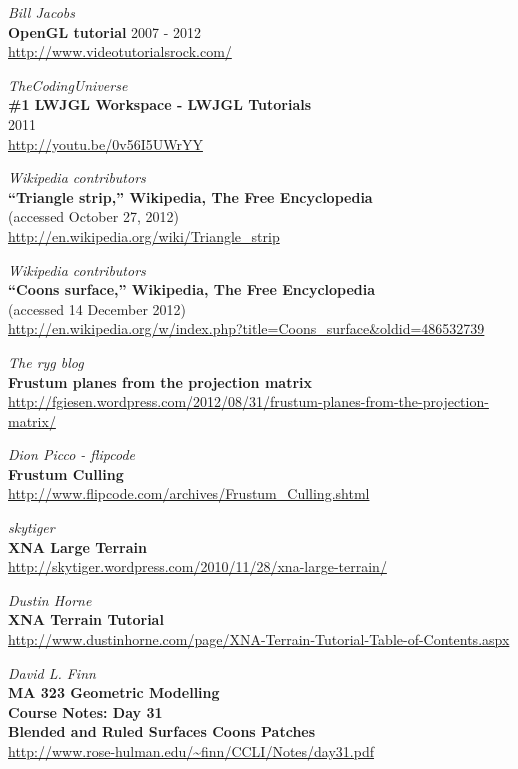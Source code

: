 \documentclass{zcu_sp}
\begin{document}
\begin{thebibliography}{5}
{\em Bill Jacobs} \\
{\bf OpenGL tutorial}
	2007 - 2012 \\
\url{http://www.videotutorialsrock.com/}

{\em TheCodingUniverse} \\
{\bf \#1 LWJGL Workspace - LWJGL Tutorials} \\
	2011 \\
\url{http://youtu.be/0v56I5UWrYY}

{\em Wikipedia contributors} \\
{\bf ``Triangle strip,'' Wikipedia, The Free Encyclopedia} \\
	(accessed October 27, 2012) \\
\url{http://en.wikipedia.org/wiki/Triangle_strip}

{\em Wikipedia contributors} \\
{\bf ``Coons surface,'' Wikipedia, The Free Encyclopedia} \\
	(accessed 14 December 2012) \\
\url{http://en.wikipedia.org/w/index.php?title=Coons_surface&oldid=486532739}

{\em The ryg blog} \\
{\bf Frustum planes from the projection matrix} \\
\url{http://fgiesen.wordpress.com/2012/08/31/frustum-planes-from-the-projection-matrix/}

{\em Dion Picco - flipcode} \\
{\bf Frustum Culling} \\
\url{http://www.flipcode.com/archives/Frustum_Culling.shtml}

{\em skytiger} \\
{\bf XNA Large Terrain} \\
\url{http://skytiger.wordpress.com/2010/11/28/xna-large-terrain/}

{\em Dustin Horne} \\
{\bf XNA Terrain Tutorial} \\
\url{http://www.dustinhorne.com/page/XNA-Terrain-Tutorial-Table-of-Contents.aspx}

{\em David L. Finn} \\
{\bf MA 323 Geometric Modelling \\ Course Notes: Day 31 \\ Blended and Ruled Surfaces Coons Patches} \\
\url{http://www.rose-hulman.edu/~finn/CCLI/Notes/day31.pdf}

\end{thebibliography}
\end{document}
